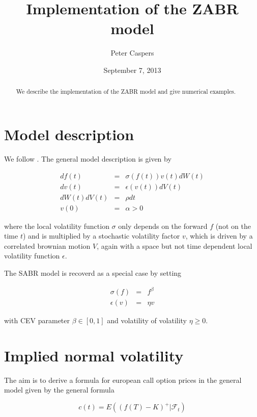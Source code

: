 \documentclass{amsart}
\theoremstyle{plain}
\numberwithin{equation}{section}
\begin{document}
\title{Implementation of the ZABR model}
\author{Peter Caspers}
\date{September 7, 2013}
\maketitle

\begin{abstract}
We describe the implementation of the ZABR model \cite{zabr} and give numerical examples.
\end{abstract}

\section{Model description}
We follow \cite{zabr}. The general model description is given by

\begin{eqnarray}\label{generalmodeldef}
df(t) &=& \sigma(f(t)) v(t) dW(t) \\
dv(t) &=& \epsilon(v(t)) dV(t) \\
dW(t) dV(t) &=& \rho dt \\
v(0) &=& \alpha > 0
\end{eqnarray}

where the local volatility function $\sigma$ only depends on the forward $f$ (not on the time $t$) and is multiplied by a
stochastic volatility factor $v$, which is driven by a correlated brownian motion $V$, again with a space but not time dependent local volatility function $\epsilon$.

The SABR model is recoverd as a special case by setting

\begin{eqnarray}
\sigma(f) &=& f^{\beta} \\
\epsilon(v) &=& \eta v
\end{eqnarray}

with CEV parameter $\beta \in [0,1]$ and volatility of volatility $\eta \geq 0$.

\section{Implied normal volatility}

The aim is to derive a formula for european call option prices in the general model given by the general formula

\begin{equation}
c(t) = E( (f(T)-K)^+ | \mathcal{F}_t )
\end{equation}
\end{document}
